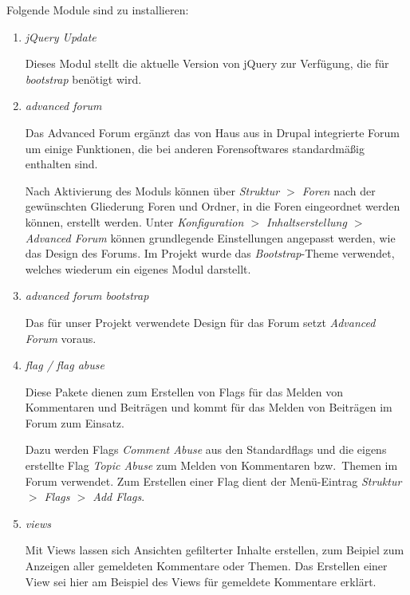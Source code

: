 \documentclass[a4paper,11pt,twoside]{article}
\begin{document}
Folgende Module sind zu installieren: 
\begin{enumerate}

\item \emph{jQuery Update}

Dieses Modul stellt die aktuelle Version von jQuery zur Verfügung, die für
\textit{bootstrap} benötigt wird.

\item \emph{advanced forum}

Das Advanced Forum ergänzt das von Haus aus in Drupal integrierte Forum um
einige Funktionen, die bei anderen Forensoftwares standardmäßig enthalten sind.

Nach Aktivierung des Moduls können über \emph{Struktur $>$ Foren} nach der
gewünschten Gliederung Foren und Ordner, in die Foren eingeordnet werden
können, erstellt werden. Unter \emph{Konfiguration $>$ Inhaltserstellung $>$
  Advanced Forum} können grundlegende Einstellungen angepasst werden, wie das
Design des Forums. Im Projekt wurde das \emph{Bootstrap}-Theme verwendet,
welches wiederum ein eigenes Modul darstellt.

\item \emph{advanced forum bootstrap}

Das für unser Projekt verwendete Design für das Forum setzt \emph{Advanced
  Forum} voraus.

\item \emph{flag / flag abuse}

Diese Pakete dienen zum Erstellen von Flags für das Melden von Kommentaren und
Beiträgen und kommt für das Melden von Beiträgen im Forum zum Einsatz.

Dazu werden Flags \textit{Comment Abuse} aus den Standardflags und die eigens
erstellte Flag \textit{Topic Abuse} zum Melden von Kommentaren bzw.\ Themen im
Forum verwendet. Zum Erstellen einer Flag dient der Menü-Eintrag
\textit{Struktur $>$ Flags $>$ Add Flags}.

\item \emph{views}

Mit Views lassen sich Ansichten gefilterter Inhalte erstellen, zum Beipiel zum
Anzeigen aller gemeldeten Kommentare oder Themen. Das Erstellen einer View sei
hier am Beispiel des Views für gemeldete Kommentare erklärt.


\end{enumerate}
\end{document}
